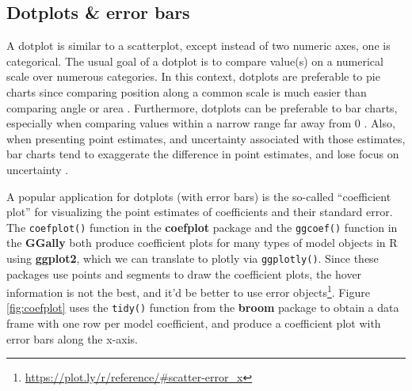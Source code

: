 \documentclass[
  12pt,
]{krantz}
\renewcommand{\href}[2]{#2\footnote{\url{#1}}}
\begin{document}
\hypertarget{dot-plots}{%
\subsection{Dotplots \& error bars}\label{dot-plots}}


A dotplot is similar to a scatterplot, except instead of two numeric axes, one is categorical. The usual goal of a dotplot is to compare value(s) on a numerical scale over numerous categories. In this context, dotplots are preferable to pie charts since comparing position along a common scale is much easier than comparing angle or area \citep{graphical-perception, crowdsourcing-graphical-perception}. Furthermore, dotplots can be preferable to bar charts, especially when comparing values within a narrow range far away from 0 \citep{few-values}. Also, when presenting point estimates, and uncertainty associated with those estimates, bar charts tend to exaggerate the difference in point estimates, and lose focus on uncertainty \citep{messing}.

A popular application for dotplots (with error bars) is the so-called ``coefficient plot'' for visualizing the point estimates of coefficients and their standard error. The \texttt{coefplot()} function in the \textbf{coefplot} package \citep{coefplot} and the \texttt{ggcoef()} function in the \textbf{GGally} both produce coefficient plots for many types of model objects in R using \textbf{ggplot2}, which we can translate to plotly via \texttt{ggplotly()}. Since these packages use points and segments to draw the coefficient plots, the hover information is not the best, and it'd be better to use \href{https://plot.ly/r/reference/\#scatter-error_x}{error objects}. Figure \ref{fig:coefplot} uses the \texttt{tidy()} function from the \textbf{broom} package \citep{broom} to obtain a data frame with one row per model coefficient, and produce a coefficient plot with error bars along the x-axis.
\end{document}
